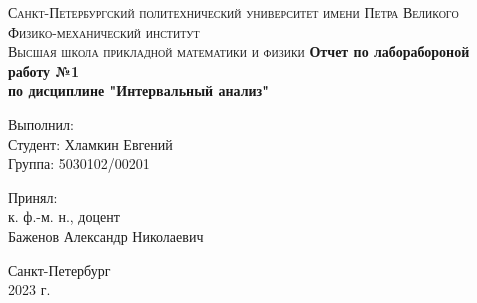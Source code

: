 \documentclass[a4paper,12pt]{article}
\begin{document}
\begin{titlepage}
    \begin{center}
        \textsc{
            Санкт-Петербургский политехнический университет имени Петра Великого \\[5mm]
            Физико-механический институт\\[2mm]
            Высшая школа прикладной математики и физики            
        }   
        \vfill
        \textbf{\large
            Отчет по лаборабороной работу №1\\
            по дисциплине "Интервальный анализ"\\[3mm]
        }                
    \end{center}

    \vfill
    \hfill
    \begin{minipage}{0.5\textwidth}
        Выполнил: \\[2mm]   
		Студент: Хламкин Евгений \\
		Группа: 5030102/00201\\
    \end{minipage}

	\hfill
	\begin{minipage}{0.5\textwidth}
		Принял: \\[2mm]
		к. ф.-м. н., доцент \\   
		Баженов Александр Николаевич
	\end{minipage}

    \vfill
    
    \begin{center}
    Санкт-Петербург\\
    2023 г.\\
    \end{center}
\end{titlepage}

\tableofcontents
\newpage
\end{document}

